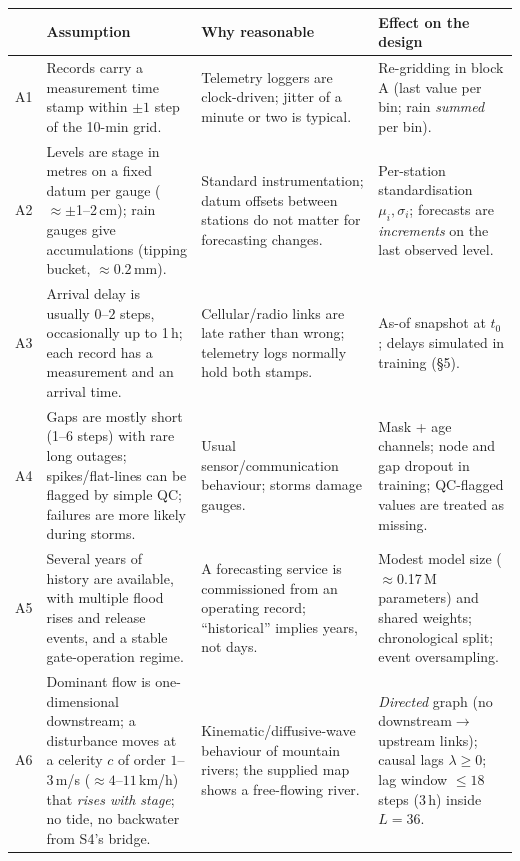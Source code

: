 \begin{table}[H]\centering\footnotesize
\renewcommand{\arraystretch}{1.12}
\begin{tabularx}{\linewidth}{@{}l>{\raggedright\arraybackslash}p{4.6cm}>{\raggedright\arraybackslash}X>{\raggedright\arraybackslash}X@{}}
\toprule
 & Assumption & Why reasonable & Effect on the design \\ \midrule
A1 & Records carry a measurement time stamp within $\pm1$ step of the 10-min grid.& Telemetry loggers are clock-driven; jitter of a minute or two is typical.& Re-gridding in block A (last value per bin; rain \emph{summed} per bin).\\
A2 & Levels are stage in metres on a fixed datum per gauge ($\approx\pm$1--2\,cm); rain gauges give accumulations (tipping bucket, $\approx0.2$\,mm).& Standard instrumentation; datum offsets between stations do not matter for forecasting changes.& Per-station standardisation $\mu_i,\sigma_i$; forecasts are \emph{increments} on the last observed level.\\
A3 & Arrival delay is usually $0$--$2$ steps, occasionally up to 1\,h; each record has a measurement and an arrival time.& Cellular/radio links are late rather than wrong; telemetry logs normally hold both stamps.& As-of snapshot at $t_0$; delays simulated in training (\S5).\\
A4 & Gaps are mostly short (1--6 steps) with rare long outages; spikes/flat-lines can be flagged by simple QC; failures are more likely during storms.& Usual sensor/communication behaviour; storms damage gauges.& Mask + age channels; node and gap dropout in training; QC-flagged values are treated as missing.\\
A5 & Several years of history are available, with multiple flood rises and release events, and a stable gate-operation regime.& A forecasting service is commissioned from an operating record; ``historical'' implies years, not days.& Modest model size ($\approx$0.17\,M parameters) and shared weights; chronological split; event oversampling.\\
A6 & Dominant flow is one-dimensional downstream; a disturbance moves at a celerity $c$ of order $1$--$3$\,m/s ($\approx4$--$11$\,km/h) that \emph{rises with stage}; no tide, no backwater from S4's bridge.& Kinematic/diffusive-wave behaviour of mountain rivers; the supplied map shows a free-flowing river.& \emph{Directed} graph (no downstream$\to$upstream links); causal lags $\lambda\!\ge\!0$; lag window $\le18$ steps (3\,h) inside $L{=}36$.\\

\end{tabularx}
\end{table}
